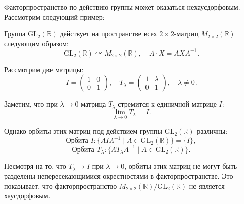 	\begin{remark}
		Факторпространство по действию группы может оказаться нехаусдорфовым. Рассмотрим следующий пример:
		
		Группа $ \mathrm{GL}_2(\mathbb{R}) $ действует на пространстве всех $ 2 \times 2 $-матриц $ M_{2 \times 2}(\mathbb{R}) $ следующим образом:
		\[
		\mathrm{GL}_2(\mathbb{R}) \curvearrowright M_{2 \times 2}(\mathbb{R}), \quad A \cdot X = A X A^{-1}.
		\]
		
		Рассмотрим две матрицы:
		\[
		I = \begin{pmatrix}
		1 & 0 \\
		0 & 1
		\end{pmatrix}, \quad
		T_\lambda = \begin{pmatrix}
		1 & \lambda \\
		0 & 1
		\end{pmatrix}, \quad \lambda \neq 0.
		\]
		
		Заметим, что при $ \lambda \to 0 $ матрица $ T_\lambda $ стремится к единичной матрице $ I $:
		\[
		\lim_{\lambda \to 0} T_\lambda = I.
		\]
		
		Однако орбиты этих матриц под действием группы $ \mathrm{GL}_2(\mathbb{R}) $ различны:
		\[
		\text{Орбита } I: \{A I A^{-1} \mid A \in \mathrm{GL}_2(\mathbb{R})\} = \{I\},
		\]
		\[
		\text{Орбита } T_\lambda: \{A T_\lambda A^{-1} \mid A \in \mathrm{GL}_2(\mathbb{R})\}.
		\]
		
		Несмотря на то, что $ T_\lambda \to I $ при $ \lambda \to 0 $, орбиты этих матриц не могут быть разделены непересекающимися окрестностями в факторпространстве. Это показывает, что факторпространство $ M_{2 \times 2}(\mathbb{R}) / \mathrm{GL}_2(\mathbb{R}) $ не является хаусдорфовым.
		\end{remark}






